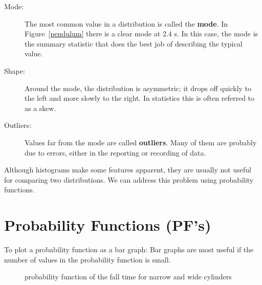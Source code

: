 \begin{description}

\item[Mode:] The most common value in a distribution is called the
  {\bf mode}.  In Figure~\ref{pendulum} there is a clear mode at 2.4 s.  In this case, the mode is the summary statistic that does
  the best job of describing the typical value.

\item[Shape:] Around the mode, the distribution is asymmetric; it
  drops off quickly to the left and more slowly to the right.  In statistics this is often referred to as a skew. 

\item[Outliers:] Values far from the mode are called {\bf outliers}.
  Many of them are probably due to errors, either in the reporting
  or recording of data.

\end{description}

Although histograms make some features apparent, they are usually not
useful for comparing two distributions.  We can address this problem using probability functions.


\section{Probability Functions (PF's)}


To plot a probability function as a bar graph:  Bar graphs are most useful if the number
of values in the probability function is small.

\begin{figure}[h]
\caption{ \quad probability function of the fall time for narrow and wide cylinders}
\label{narrow_wide_cylinders}
\end{figure}

